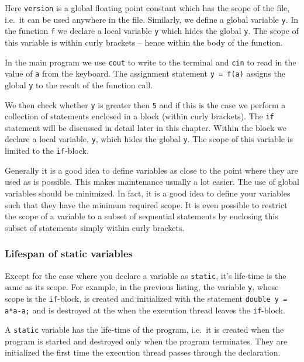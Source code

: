 \noindent {\small }

\noindent
Here \verb+version+ is a global floating point constant which has the scope of
the file, i.e.\  it can be used anywhere in the file. Similarly, we define a global
variable \verb+y+. In the function \verb+f+ we declare a local variable \verb+y+
which hides the global \verb+y+. The scope of this variable is within curly brackets
-- hence within the body of the function.

In the main program we use \verb+cout+ to write to the terminal and \verb+cin+ to
read in the value of \verb+a+ from the keyboard. The assignment statement
\verb+y = f(a)+ assigns the global \verb+y+ to the result of the function call.

We then check whether \verb+y+ is greater then \verb+5+ and if this is the case
we perform a collection of statements enclosed in a block (within curly brackets).
The \verb+if+ statement will be discussed in detail later in this chapter. Within the
block we declare a local variable, \verb+y+, which hides the global \verb+y+. The
scope of this variable is limited to the \verb+if+-block.

Generally it is a good idea to define variables as close to the point
where they are used as is possible. This makes maintenance usually a lot easier.
The use of global variables should be minimized. In fact, it is a good idea to
define your variables such that they have the minimum required scope. It is
even possible to restrict the scope of a variable to a subset of sequential
statements by enclosing this subset of statements simply within curly brackets.


\subsubsection{Lifespan of static variables}

Except for the case where you declare a variable as \verb+static+, it's life-time
is the same as its scope. For example, in the previous listing, the
variable \verb+y+, whose scope is the \verb+if+-block, is created and initialized
with the statement \verb+double y = a*a-a;+ and is destroyed at the when
the execution thread leaves the \verb+if+-block.

A \verb+static+ variable has the life-time of the program, i.e.\
it is created when the program is started and destroyed only when the program
terminates. They are initialized the first time the execution thread passes through
the declaration.

